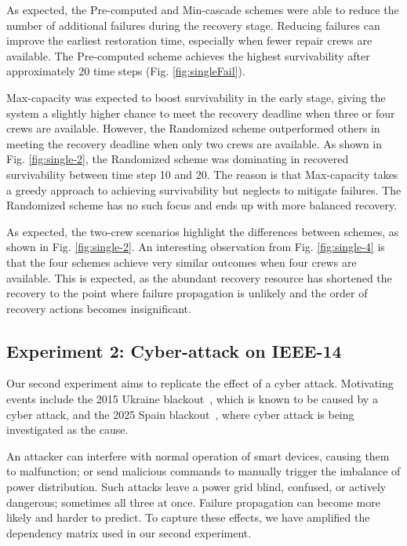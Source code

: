 \documentclass[conference]{IEEEtran}
\begin{document}
As expected, the Pre-computed and Min-cascade schemes were able to reduce the number of additional failures during the recovery stage. Reducing failures can improve the earliest restoration time, especially when fewer repair crews are available. The Pre-computed scheme achieves the highest survivability after approximately 20 time steps (Fig.  \ref{fig:singleFail}). 


Max-capacity was expected to boost survivability in the early stage, giving the system a slightly higher chance to meet the recovery deadline when three or four crews are available. However, the Randomized scheme outperformed others in meeting the recovery deadline when only two crews are available. As shown in Fig.  \ref{fig:single-2}, the Randomized scheme was dominating in recovered survivability between time step 10 and 20. The reason is that Max-capacity takes a greedy approach to achieving survivability but neglects to mitigate failures. The Randomized scheme has no such focus and ends up with more balanced recovery. 

As expected, the two-crew scenarios highlight the differences between schemes, as shown in Fig.  \ref{fig:single-2}. An interesting observation from Fig.  \ref{fig:single-4} is that the four schemes achieve very similar outcomes when four crews are available. This is expected, as the abundant recovery resource has shortened the recovery to the point where failure propagation is unlikely and the order of recovery actions becomes insignificant.

\subsection{Experiment 2: Cyber-attack on IEEE-14}

Our second experiment aims to replicate the effect of a cyber attack. Motivating events include the 2015 Ukraine blackout~\cite{liang_2015_2017}, which is known to be caused by a cyber attack, and the  2025 Spain blackout~\cite{cetinkaya_technical_2025}, where cyber attack is being investigated as the cause. 

An attacker can interfere with normal operation of smart devices, causing them to malfunction; or send malicious commands to manually trigger the imbalance of power distribution. Such attacks leave a power grid blind, confused, or actively dangerous; sometimes all three at once. Failure propagation can become more likely and harder to predict. To capture these effects, we have amplified the dependency matrix used in our second experiment. 
\end{document}
